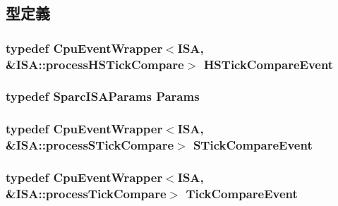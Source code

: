 \subsection{型定義}
\hypertarget{classSparcISA_1_1ISA_ac90fb4d74917543141ff203e233b2635}{
\subsubsection[{HSTickCompareEvent}]{\setlength{\rightskip}{0pt plus 5cm}typedef {\bf CpuEventWrapper}$<${\bf ISA}, \&ISA::processHSTickCompare$>$ {\bf HSTickCompareEvent}}}
\label{classSparcISA_1_1ISA_ac90fb4d74917543141ff203e233b2635}
\hypertarget{classSparcISA_1_1ISA_ac7cac3e1b138ac21b8c4fddb4d68ed25}{
\subsubsection[{Params}]{\setlength{\rightskip}{0pt plus 5cm}typedef SparcISAParams {\bf Params}}}
\label{classSparcISA_1_1ISA_ac7cac3e1b138ac21b8c4fddb4d68ed25}
\hypertarget{classSparcISA_1_1ISA_a8a23f1de4077b437f4cb46bb42bea046}{
\subsubsection[{STickCompareEvent}]{\setlength{\rightskip}{0pt plus 5cm}typedef {\bf CpuEventWrapper}$<${\bf ISA}, \&ISA::processSTickCompare$>$ {\bf STickCompareEvent}}}
\label{classSparcISA_1_1ISA_a8a23f1de4077b437f4cb46bb42bea046}
\hypertarget{classSparcISA_1_1ISA_aa0cdda97db933627d221397f0073c608}{
\subsubsection[{TickCompareEvent}]{\setlength{\rightskip}{0pt plus 5cm}typedef {\bf CpuEventWrapper}$<${\bf ISA}, \&ISA::processTickCompare$>$ {\bf TickCompareEvent}}}
\label{classSparcISA_1_1ISA_aa0cdda97db933627d221397f0073c608}


